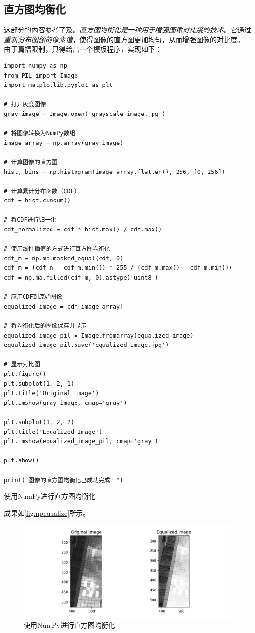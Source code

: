 \subsection{直方图均衡化}

这部分的内容参考了\cite{solem2014python计算机视觉编程}及\cite{天海一直在AI2022}。\textit{直方图均衡化是一种用于增强图像对比度的技术}。它通过\textit{重新分布图像的像素值}，使得图像的直方图更加均匀，从而增强图像的对比度。\\

由于篇幅限制，只得给出一个模板程序，实现如下：

\begin{longlisting}
    \begin{verbatim}
import numpy as np
from PIL import Image
import matplotlib.pyplot as plt

# 打开灰度图像
gray_image = Image.open('grayscale_image.jpg')

# 将图像转换为NumPy数组
image_array = np.array(gray_image)

# 计算图像的直方图
hist, bins = np.histogram(image_array.flatten(), 256, [0, 256])

# 计算累计分布函数（CDF）
cdf = hist.cumsum()

# 将CDF进行归一化
cdf_normalized = cdf * hist.max() / cdf.max()

# 使用线性插值的方式进行直方图均衡化
cdf_m = np.ma.masked_equal(cdf, 0)
cdf_m = (cdf_m - cdf_m.min()) * 255 / (cdf_m.max() - cdf_m.min())
cdf = np.ma.filled(cdf_m, 0).astype('uint8')

# 应用CDF到原始图像
equalized_image = cdf[image_array]

# 将均衡化后的图像保存并显示
equalized_image_pil = Image.fromarray(equalized_image)
equalized_image_pil.save('equalized_image.jpg')

# 显示对比图
plt.figure()
plt.subplot(1, 2, 1)
plt.title('Original Image')
plt.imshow(gray_image, cmap='gray')

plt.subplot(1, 2, 2)
plt.title('Equalized Image')
plt.imshow(equalized_image_pil, cmap='gray')

plt.show()

print("图像的直方图均衡化已成功完成！")
    \end{verbatim}
    \caption{使用NumPy进行直方图均衡化}
    \label{listing:npequalize}
\end{longlisting}

成果如\autoref{fig:npequalize}所示。

\begin{figure}[!h]
    \centering
    \includegraphics[width=.8\textwidth]{./Figures/N2.png}
    \caption{使用NumPy进行直方图均衡化}
    \label{fig:npequalize}
\end{figure}

